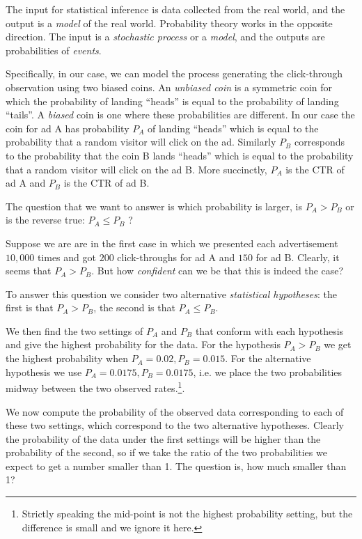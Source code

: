 The input for statistical inference is data collected from the real
world, and the output is a {\em model} of the real world. Probability
theory works in the opposite direction. The input is a {\em stochastic
  process} or a {\em model}, and the outputs are probabilities of {\em
  events}.

Specifically, in our case, we can model the process generating the
click-through observation using two biased coins. An {\em unbiased
  coin} is a symmetric coin for which the probability of landing
``heads'' is equal to the probability of landing ``tails''.  A {\em
  biased} coin is one where these probabilities are different.  In our
case the coin for ad A has probability $P_A$ of landing ``heads''
which is equal to the probability that a random visitor will click on
the ad. Similarly $P_B$ corresponds to the probability that the coin B
lands ``heads'' which is equal to the probability that a random
visitor will click on the ad B. More succinctly, $P_A$ is the CTR of
ad A and $P_B$ is the CTR of ad B.

The question that we want to answer is which probability is larger, is
$P_A>P_B$ or is the reverse true: $P_A \leq P_B$ ?

Suppose we are are in the first case in which we presented each
advertisement $10,000$ times and got $200$ click-throughs for ad A and
$150$ for ad B. Clearly, it seems that $P_A>P_B$. But how {\em
  confident} can we be that this is indeed the case?

To answer this question we consider two alternative {\em statistical
hypotheses}: the first is that $P_A>P_B$, the second is that $P_A
\leq P_B$. 

We then find the two settings of $P_A$ and $P_B$ that conform with
each hypothesis and give the highest probability for the data.  For
the hypothesis $P_A>P_B$ we get the highest probability when
$P_A=0.02,P_B=0.015$. For the alternative hypothesis we use
$P_A=0.0175,P_B=0.0175$, i.e. we place the two probabilities midway
between the two observed rates.\footnote{Strictly speaking the
  mid-point is not the highest probability setting, but the difference
  is small and we ignore it here.}.

We now compute the probability of the observed data corresponding to
each of these two settings, which correspond to the two alternative
hypotheses. Clearly the probability of the data under the first
settings will be higher than the probability of the second, so if we
take the ratio of the two probabilities we expect to get a number
smaller than 1. The question is, how much smaller than 1?

